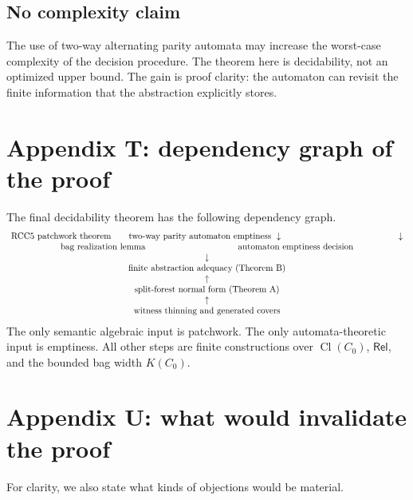 \documentclass[11pt]{article}
\newcommand{\Rel}{\mathsf{Rel}}
\newcommand{\Cl}{\operatorname{Cl}}
\begin{document}
\subsection{No complexity claim}

The use of two-way alternating parity automata may increase the worst-case complexity of the decision procedure.  The theorem here is decidability, not an optimized upper bound.  The gain is proof clarity: the automaton can revisit the finite information that the abstraction explicitly stores.

\section{Appendix T: dependency graph of the proof}

The final decidability theorem has the following dependency graph.
\[
\begin{array}{c}
\text{RCC5 patchwork theorem}\qquad \text{two-way parity automaton emptiness}\
\downarrow \hspace{4.7cm} \downarrow\\
\text{bag realization lemma}\hspace{3.7cm}\text{automaton emptiness decision}\\
\downarrow\\
\text{finite abstraction adequacy (Theorem B)}\\
\uparrow\\
\text{split-forest normal form (Theorem A)}\\
\uparrow\\
\text{witness thinning and generated covers}
\end{array}
\]
The only semantic algebraic input is patchwork.  The only automata-theoretic input is emptiness.  All other steps are finite constructions over $\Cl(C_0)$, $\Rel$, and the bounded bag width $K(C_0)$.

\section{Appendix U: what would invalidate the proof}

For clarity, we also state what kinds of objections would be material.
\end{document}
